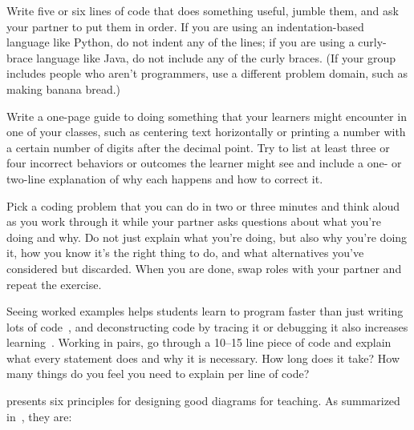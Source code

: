 
Write five or six lines of code that does something useful,
jumble them,
and ask your partner to put them in order.
If you are using an indentation-based language like Python,
do not indent any of the lines;
if you are using a curly-brace language like Java,
do not include any of the curly braces.
(If your group includes people who aren't programmers,
use a different problem domain,
such as making banana bread.)


Write a one-page guide to doing something that your learners might encounter in one of your classes,
such as centering text horizontally
or printing a number with a certain number of digits after the decimal point.
Try to list at least three or four incorrect behaviors or outcomes the learner might see
and include a one- or two-line explanation
of why each happens and how to correct it.


Pick a coding problem that you can do in two or three minutes
and think aloud as you work through it
while your partner asks questions about what you're doing and why.
Do not just explain what you're doing,
but also why you're doing it,
how you know it's the right thing to do,
and what alternatives you've considered but discarded.
When you are done,
swap roles with your partner and repeat the exercise.


Seeing worked examples helps students learn to program faster than just writing lots of code~\cite{Skud2014},
and deconstructing code by tracing it or debugging it also increases learning~\cite{Grif2016}.
Working in pairs,
go through a 10--15 line piece of code and explain what every statement does
and why it is necessary.
How long does it take?
How many things do you feel you need to explain per line of code?


\cite{Maye2009} presents six principles for designing good diagrams for teaching.
As summarized in~\cite{Mill2016a},
they are:

